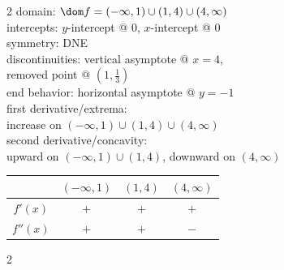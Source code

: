 \documentclass{book}
\begin{document}
\begin{appendices}
\begin{enumerate}[!HW!]
\begin{multicols}{2}
domain: $\dom f = (-\infty,1)\cup(1,4)\cup(4,\infty)$\\
intercepts: $y$-intercept @ 0, $x$-intercept @ 0\\
symmetry:  DNE \\ 
discontinuities: vertical asymptote @ $x=4$,\\ removed point @ $\left(1,\frac{1}{3}\right)$\\
end behavior: horizontal asymptote @ $y=-1$\\ 
first derivative/extrema:\\ increase on $(-\infty,1)\cup(1,4)\cup(4,\infty)$ \\
second derivative/concavity:\\ upward on $(-\infty,1)\cup (1,4)$, downward on $(4, \infty)$ \vspace{-15pt}
\begin{center}
\begin{tabular}{c|c|c|c}
 & $(-\infty, 1)$ & $(1, 4)$ & $(4,\infty)$ \\ \hline
$f'(x)$ & $+$ & $+$ & $+$ \\ 
$f''(x)$ & $+$ & $+$ & $-$\\ 
\end{tabular}
\end{center} 
\end{multicols}


\itemspade \mbox{}\vspace{-25pt}

\begin{multicols}{2}
\columnbreak


\end{multicols}
\end{enumerate}
\end{appendices}
\end{document}
